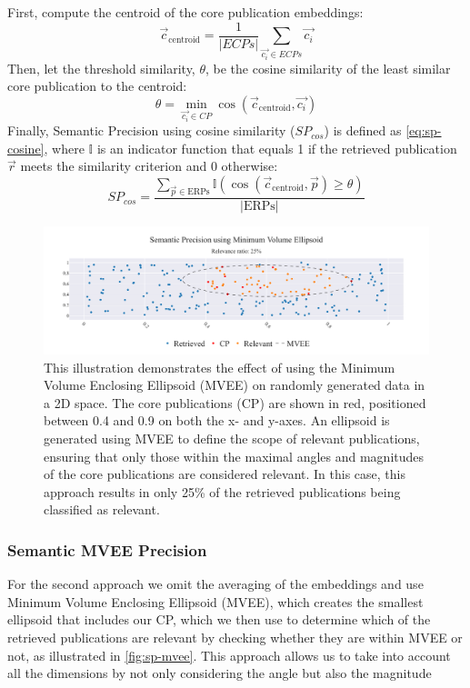 First, compute the centroid of the core publication embeddings:
\[
\vec{c}_{\text{centroid}} = \frac{1}{|ECPs|} \sum_{\vec{c_i} \in ECPs} \vec{c_i}
\]
Then, let the threshold similarity, $\theta$, be the cosine similarity of the least similar core publication to the centroid:
\[
\theta = \min_{\vec{c_i} \in CP} \cos(\vec{c}_{\text{centroid}}, \vec{c_i})
\]
Finally, Semantic Precision using cosine similarity ($SP_{cos}$) is defined as \autoref{eq:sp-cosine}, where $\mathbb{I}$ is an indicator function that equals 1 if the retrieved publication $\vec{r}$ meets the similarity criterion and 0 otherwise:
\begin{equation}\label{eq:sp-cosine}
	SP_{cos} = \frac{\sum_{\vec{p} \in \text{ERPs}} \mathbb{I} \left( \cos(\vec{c}_{\text{centroid}}, \vec{p}) \geq \theta \right)}{|\text{ERPs}|}
\end{equation}

\begin{figure}[h!]
	\centering	
	\includegraphics[scale=0.4]{pics/sp_mvee.pdf}
	\caption[Semantic Precision using MVEEE]{This illustration demonstrates the effect of using the Minimum Volume Enclosing Ellipsoid (MVEE) on randomly generated data in a 2D space. The core publications (CP) are shown in red, positioned between 0.4 and 0.9 on both the x- and y-axes. An ellipsoid is generated using MVEE to define the scope of relevant publications, ensuring that only those within the maximal angles and magnitudes of the core publications are considered relevant. In this case, this approach results in only 25\% of the retrieved publications being classified as relevant.}

	\label{fig:sp-mvee}
\end{figure}

\subsubsection{Semantic MVEE Precision}
For the second approach we omit the averaging of the embeddings and use Minimum Volume Enclosing Ellipsoid (MVEE), which creates the smallest ellipsoid that includes our CP, which we then use to determine which of the retrieved publications are relevant by checking whether they are within MVEE or not, as illustrated in \autoref{fig:sp-mvee}. This approach allows us to take into account all the dimensions by not only considering the angle but also the magnitude

